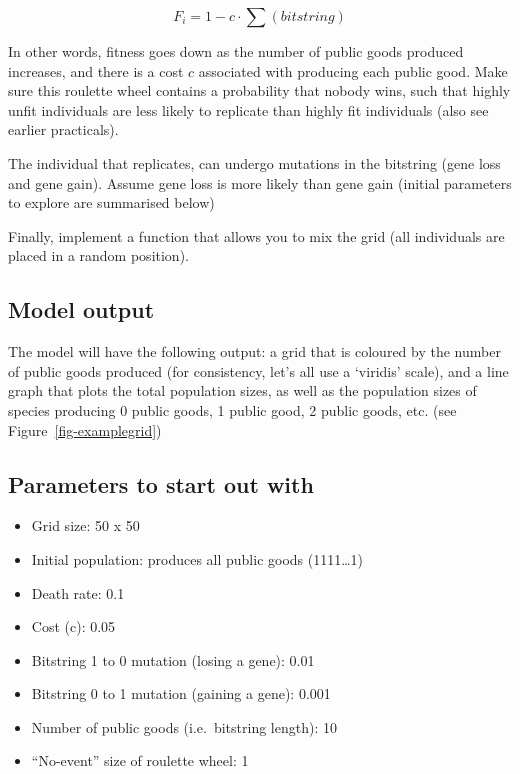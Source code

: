 \documentclass[
  letterpaper,
  DIV=11,
  numbers=noendperiod]{scrreprt}
\providecommand{\tightlist}{%
  \setlength{\itemsep}{0pt}\setlength{\parskip}{0pt}}\usepackage{longtable,booktabs,array}
\theoremstyle{definition}
\theoremstyle{remark}
\begin{document}
\[
F_i = 1 - c \cdot \sum({bitstring})
\]

In other words, fitness goes down as the number of public goods produced
increases, and there is a cost \(c\) associated with producing each
public good. Make sure this roulette wheel contains a probability that
nobody wins, such that highly unfit individuals are less likely to
replicate than highly fit individuals (also see earlier practicals).

The individual that replicates, can undergo mutations in the bitstring
(gene loss and gene gain). Assume gene loss is more likely than gene
gain (initial parameters to explore are summarised below)

Finally, implement a function that allows you to mix the grid (all
individuals are placed in a random position).

\subsection{Model output}\label{model-output}

The model will have the following output: a grid that is coloured by the
number of public goods produced (for consistency, let's all use a
`viridis' scale), and a line graph that plots the total population
sizes, as well as the population sizes of species producing 0 public
goods, 1 public good, 2 public goods, etc. (see
Figure~\ref{fig-examplegrid})

\subsection{Parameters to start out
with}\label{parameters-to-start-out-with}

\begin{itemize}
\tightlist
\item
  Grid size: 50 x 50
\item
  Initial population: produces all public goods (1111\ldots1)
\item
  Death rate: 0.1
\item
  Cost (c): 0.05
\item
  Bitstring 1 to 0 mutation (losing a gene): 0.01
\item
  Bitstring 0 to 1 mutation (gaining a gene): 0.001
\item
  Number of public goods (i.e.~bitstring length): 10
\item
  ``No-event'' size of roulette wheel: 1
\end{itemize}
\end{document}
